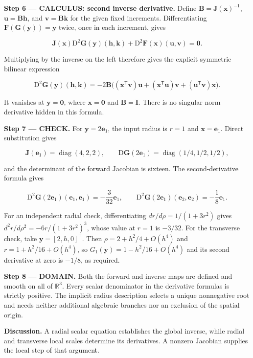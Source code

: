\documentclass[11pt,oneside,openany]{book}
\begin{document}
\textbf{Step 6 --- CALCULUS: second inverse derivative.} Define \(\mathbf B=\mathbf J(\mathbf x)^{-1}\), \(\mathbf u=\mathbf B\mathbf h\), and \(\mathbf v=\mathbf B\mathbf k\) for the given fixed increments. Differentiating \(\mathbf F(\mathbf G(\mathbf y))=\mathbf y\) twice, once in each increment, gives

\[
\mathbf J(\mathbf x)\mathrm D^2\mathbf G(\mathbf y)(\mathbf h,\mathbf k)
+\mathrm D^2\mathbf F(\mathbf x)(\mathbf u,\mathbf v)=\mathbf0.
\]

Multiplying by the inverse on the left therefore gives the explicit symmetric bilinear expression

\[
\mathrm D^2\mathbf G(\mathbf y)(\mathbf h,\mathbf k)
=-2\mathbf B\bigl((\mathbf x^{\mathsf T}\mathbf v)\mathbf u
+(\mathbf x^{\mathsf T}\mathbf u)\mathbf v
+(\mathbf u^{\mathsf T}\mathbf v)\mathbf x\bigr).
\]

It vanishes at \(\mathbf y=\mathbf0\), where \(\mathbf x=\mathbf0\) and \(\mathbf B=\mathbf I\). There is no singular norm derivative hidden in this formula.

\textbf{Step 7 --- CHECK.} For \(\mathbf y=2\mathbf e_1\), the input radius is \(r=1\) and \(\mathbf x=\mathbf e_1\). Direct substitution gives

\[
\mathbf J(\mathbf e_1)=\operatorname{diag}(4,2,2),\qquad
\mathrm D\mathbf G(2\mathbf e_1)=\operatorname{diag}(1/4,1/2,1/2),
\]

and the determinant of the forward Jacobian is sixteen. The second-derivative formula gives

\[
\mathrm D^2\mathbf G(2\mathbf e_1)(\mathbf e_1,\mathbf e_1)=-\frac3{32}\mathbf e_1,\qquad
\mathrm D^2\mathbf G(2\mathbf e_1)(\mathbf e_2,\mathbf e_2)=-\frac18\mathbf e_1.
\]

For an independent radial check, differentiating \(dr/d\rho=1/(1+3r^2)\) gives \(d^2r/d\rho^2=-6r/(1+3r^2)^3\), whose value at \(r=1\) is \(-3/32\). For the transverse check, take \(\mathbf y=[2,h,0]^{\mathsf T}\). Then \(\rho=2+h^2/4+O(h^4)\) and \(r=1+h^2/16+O(h^4)\), so \(G_1(\mathbf y)=1-h^2/16+O(h^4)\) and its second derivative at zero is \(-1/8\), as required.

\begin{DomainStep}
\textbf{Step 8 --- DOMAIN.} Both the forward and inverse maps are defined and smooth on all of \(\mathbb R^3\). Every scalar denominator in the derivative formulas is strictly positive. The implicit radius description selects a unique nonnegative root and needs neither additional algebraic branches nor an exclusion of the spatial origin.

\end{DomainStep}
\textbf{Discussion.} A radial scalar equation establishes the global inverse, while radial and transverse local scales determine its derivatives. A nonzero Jacobian supplies the local step of that argument.
\end{document}
